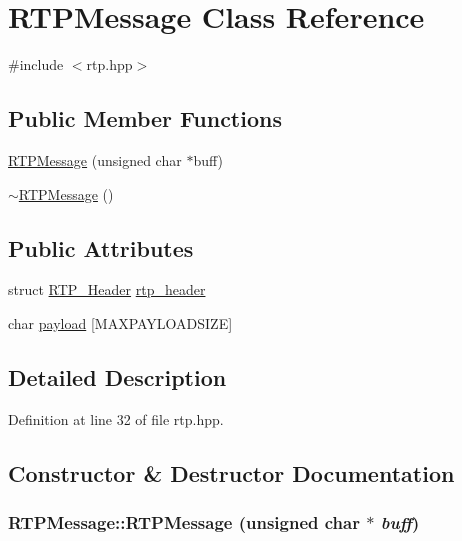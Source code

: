 \hypertarget{class_r_t_p_message}{
\section{RTPMessage Class Reference}
\label{class_r_t_p_message}
}


{\ttfamily \#include $<$rtp.hpp$>$}

\subsection*{Public Member Functions}
\begin{DoxyCompactItemize}
\item 
\hyperlink{class_r_t_p_message_ae53810d960362f0ec2e11296b878d478}{RTPMessage} (unsigned char $\ast$buff)
\item 
\hyperlink{class_r_t_p_message_a6bb17ce80caceace4664172db8269c59}{$\sim$RTPMessage} ()
\end{DoxyCompactItemize}
\subsection*{Public Attributes}
\begin{DoxyCompactItemize}
\item 
struct \hyperlink{struct_r_t_p___header}{RTP\_\-Header} \hyperlink{class_r_t_p_message_aa52df33603ba24466f498854fcc5547e}{rtp\_\-header}
\item 
char \hyperlink{class_r_t_p_message_a3773b0ab00e67051db3653feba0c5390}{payload} \mbox{[}MAXPAYLOADSIZE\mbox{]}
\end{DoxyCompactItemize}


\subsection{Detailed Description}


Definition at line 32 of file rtp.hpp.



\subsection{Constructor \& Destructor Documentation}
\hypertarget{class_r_t_p_message_ae53810d960362f0ec2e11296b878d478}{
\subsubsection[{RTPMessage}]{\setlength{\rightskip}{0pt plus 5cm}RTPMessage::RTPMessage (unsigned char $\ast$ {\em buff})}}
\label{class_r_t_p_message_ae53810d960362f0ec2e11296b878d478}


